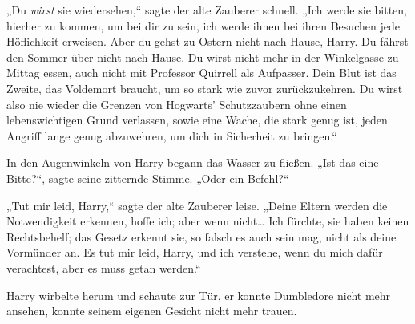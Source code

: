 „Du \emph{wirst} sie wiedersehen,“ sagte der alte Zauberer schnell. „Ich werde sie bitten, hierher zu kommen, um bei dir zu sein, ich werde ihnen bei ihren Besuchen jede Höflichkeit erweisen. Aber du gehst zu Ostern nicht nach Hause, Harry. Du fährst den Sommer über nicht nach Hause. Du wirst nicht mehr in der Winkelgasse zu Mittag essen, auch nicht mit Professor Quirrell als Aufpasser. Dein Blut ist das Zweite, das Voldemort braucht, um so stark wie zuvor zurückzukehren. Du wirst also nie wieder die Grenzen von Hogwarts' Schutzzaubern ohne einen lebenswichtigen Grund verlassen, sowie eine Wache, die stark genug ist, jeden Angriff lange genug abzuwehren, um dich in Sicherheit zu bringen.“

In den Augenwinkeln von Harry begann das Wasser zu fließen. „Ist das eine Bitte?“, sagte seine zitternde Stimme. „Oder ein Befehl?“

„Tut mir leid, Harry,“ sagte der alte Zauberer leise. „Deine Eltern werden die Notwendigkeit erkennen, hoffe ich; aber wenn nicht… Ich fürchte, sie haben keinen Rechtsbehelf; das Gesetz erkennt sie, so falsch es auch sein mag, nicht als deine Vormünder an. Es tut mir leid, Harry, und ich verstehe, wenn du mich dafür verachtest, aber es muss getan werden.“

Harry wirbelte herum und schaute zur Tür, er konnte Dumbledore nicht mehr ansehen, konnte seinem eigenen Gesicht nicht mehr trauen.

